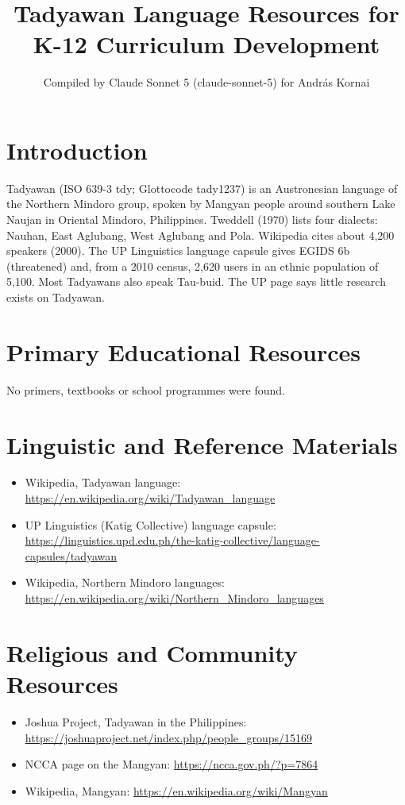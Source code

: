 \documentclass[12pt]{article}
\title{Tadyawan Language Resources for K-12 Curriculum Development}
\author{Compiled by Claude Sonnet 5 (claude-sonnet-5) for Andr\'as Kornai}
\date{}
\begin{document}
\maketitle

\section{Introduction}
Tadyawan (ISO 639-3 tdy; Glottocode tady1237) is an Austronesian language of the Northern Mindoro group, spoken by Mangyan people around southern Lake Naujan in Oriental Mindoro, Philippines. Tweddell (1970) lists four dialects: Nauhan, East Aglubang, West Aglubang and Pola. Wikipedia cites about 4,200 speakers (2000). The UP Linguistics language capsule gives EGIDS 6b (threatened) and, from a 2010 census, 2,620 users in an ethnic population of 5,100. Most Tadyawans also speak Tau-buid. The UP page says little research exists on Tadyawan.

\section{Primary Educational Resources}
No primers, textbooks or school programmes were found.

\section{Linguistic and Reference Materials}
\begin{itemize}
\item Wikipedia, Tadyawan language: \url{https://en.wikipedia.org/wiki/Tadyawan_language}
\item UP Linguistics (Katig Collective) language capsule: \url{https://linguistics.upd.edu.ph/the-katig-collective/language-capsules/tadyawan}
\item Wikipedia, Northern Mindoro languages: \url{https://en.wikipedia.org/wiki/Northern_Mindoro_languages}
\end{itemize}

\section{Religious and Community Resources}
\begin{itemize}
\item Joshua Project, Tadyawan in the Philippines: \url{https://joshuaproject.net/index.php/people_groups/15169}
\item NCCA page on the Mangyan: \url{https://ncca.gov.ph/?p=7864}
\item Wikipedia, Mangyan: \url{https://en.wikipedia.org/wiki/Mangyan}
\end{itemize}
\end{document}
